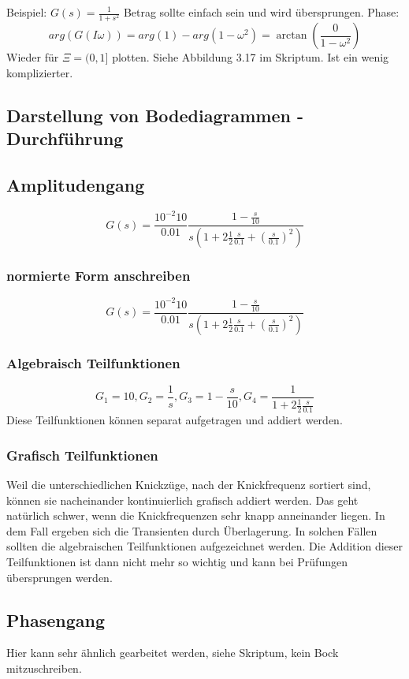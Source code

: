 \documentclass[a4paper]{article}
\begin{document}
Beispiel: $G(s)=\frac{1}{1+s^{2}}$ 
Betrag sollte einfach sein und wird übersprungen.
Phase:
\[ arg(G(I\omega))=arg(1)-arg(1-\omega^{2})=\arctan(\frac{0}{1-\omega^{2}}) \]
Wieder für $\Xi=(0, 1]$ plotten. Siehe Abbildung 3.17 im Skriptum. Ist ein wenig komplizierter.

\subsection*{Darstellung von Bodediagrammen - Durchführung}
\subsection*{Amplitudengang}
\[ G(s)=\frac{10^{-2} 10}{0.01} \frac{1-\frac{s}{10}}{s(1+2 \frac{1}{2} \frac{s}{0.1}+(\frac{s}{0.1})^{2})}\]

\subsubsection*{normierte Form anschreiben}
\[ G(s)=\frac{10^{-2} 10}{0.01} \frac{1-\frac{s}{10}}{s(1+2 \frac{1}{2} \frac{s}{0.1}+(\frac{s}{0.1})^{2})}\]

\subsubsection*{Algebraisch Teilfunktionen}
\[ G_{1}=10, G_{2}=\frac{1}{s}, G_{3}=1-\frac{s}{10}, G_{4}=\frac{1}{1+2 \frac{1}{2} \frac{s}{0.1} }\]
Diese Teilfunktionen können separat aufgetragen und addiert werden.

\subsubsection*{Grafisch Teilfunktionen}
Weil die unterschiedlichen Knickzüge, nach der Knickfrequenz sortiert sind, können sie nacheinander kontinuierlich grafisch addiert werden.
Das geht natürlich schwer, wenn die Knickfrequenzen sehr knapp anneinander liegen. In dem Fall ergeben sich die Transienten durch Überlagerung. In solchen Fällen sollten die algebraischen Teilfunktionen aufgezeichnet werden. Die Addition dieser Teilfunktionen ist dann nicht mehr so wichtig und kann bei Prüfungen übersprungen werden.

\subsection*{Phasengang}
Hier kann sehr ähnlich gearbeitet werden, siehe Skriptum, kein Bock mitzuschreiben.
\end{document}
